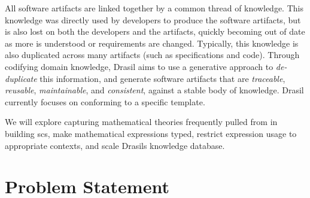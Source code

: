 \iffalse
      The usual means of building software involves multiple artifacts (such as
      specifications and code) that contain duplicate information that is also
      supposed to be linked (\textit{traceability}). Drasil aims to use a generative
      approach to de-duplicate this information and make traceability more immediate.
\fi

All software artifacts are linked together by a common thread of knowledge. This
knowledge was directly used by developers to produce the software artifacts, but
is also lost on both the developers and the artifacts, quickly becoming out of
date as more is understood or requirements are changed. Typically, this
knowledge is also duplicated across many artifacts (such as specifications and
code). Through codifying domain knowledge, Drasil\cite{Drasil2021} aims to use a
generative approach to \textit{de-duplicate} this information, and generate
software artifacts that are \textit{traceable}, \textit{reusable},
\textit{maintainable}, and \textit{consistent}, against a stable body of
knowledge. Drasil currently focuses on  conforming to a specific
 template\cite{SmithAndLai2005}.

We will explore capturing mathematical theories frequently pulled from in
building \acs{scs}, make mathematical expressions typed, restrict expression
usage to appropriate contexts, and scale Drasils knowledge database.

\section{Problem Statement}
\label{sec:intro:problemStatement}

